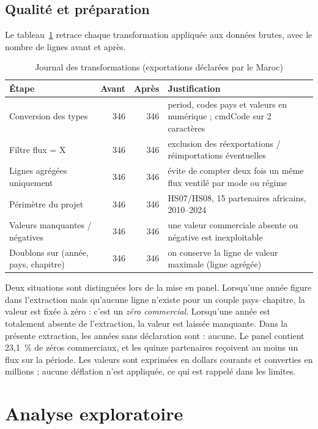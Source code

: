 \documentclass[11pt,a4paper]{article}
\begin{document}
\subsection{Qualité et préparation}
Le tableau~\ref{tab:nettoyage} retrace chaque transformation appliquée aux données brutes, avec le nombre de lignes avant et après.
\begin{table}[H]\centering\small
\caption{Journal des transformations (exportations déclarées par le Maroc)}\label{tab:nettoyage}
\begin{tabular}{p{4.3cm}rrp{7cm}}\toprule
Étape & Avant & Après & Justification \\ \midrule
Conversion des types & 346 & 346 & period, codes pays et valeurs en numérique ; cmdCode sur 2 caractères \\
Filtre flux = X & 346 & 346 & exclusion des réexportations / réimportations éventuelles \\
Lignes agrégées uniquement & 346 & 346 & évite de compter deux fois un même flux ventilé par mode ou régime \\
Périmètre du projet & 346 & 346 & HS07/HS08, 15 partenaires africains, 2010–2024 \\
Valeurs manquantes / négatives & 346 & 346 & une valeur commerciale absente ou négative est inexploitable \\
Doublons sur (année, pays, chapitre) & 346 & 346 & on conserve la ligne de valeur maximale (ligne agrégée) \\
\bottomrule\end{tabular}
\end{table}
Deux situations sont distinguées lors de la mise en panel. Lorsqu'une année figure dans l'extraction mais qu'aucune ligne n'existe pour un couple pays--chapitre, la valeur est fixée à zéro : c'est un \emph{zéro commercial}. Lorsqu'une année est totalement absente de l'extraction, la valeur est laissée manquante. Dans la présente extraction, les années sans déclaration sont : aucune. Le panel contient 23,1~\% de zéros commerciaux, et les quinze partenaires reçoivent au moins un flux sur la période. Les valeurs sont exprimées en dollars courants et converties en millions ; aucune déflation n'est appliquée, ce qui est rappelé dans les limites.

\section{Analyse exploratoire}\label{sec:eda}
\end{document}
